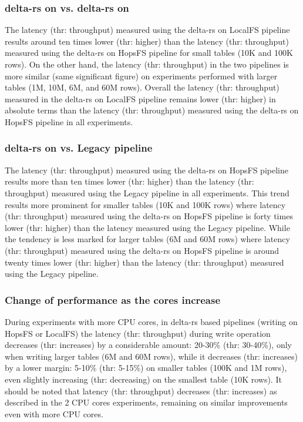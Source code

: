 \subsubsection*{delta-rs on  vs. delta-rs on }

The latency (thr: throughput) measured using the delta-rs on \gls{LocalFS} pipeline results around ten times lower (thr: higher) than the latency (thr: throughput) measured using the delta-rs on \gls{HopsFS} pipeline for small tables (10K and 100K rows). On the other hand, the latency (thr: throughput) in the two pipelines is more similar (same significant figure) on experiments performed with larger tables (1M, 10M, 6M, and 60M rows). Overall the latency (thr: throughput) measured in the delta-rs on \gls{LocalFS} pipeline remains lower (thr: higher) in absolute terms than the latency (thr: throughput) measured using the delta-rs on \gls{HopsFS} pipeline in all experiments.

\subsubsection*{delta-rs on  vs. Legacy pipeline}

The latency (thr: throughput) measured using the delta-rs on \gls{HopsFS} pipeline results more than ten times lower (thr: higher) than the latency (thr: throughput) measured using the Legacy pipeline in all experiments. This trend results more prominent for smaller tables (10K and 100K rows) where latency (thr: throughput) measured using the delta-rs on \gls{HopsFS} pipeline is forty times lower (thr: higher) than the latency measured using the Legacy pipeline. While the tendency is less marked for larger tables (6M and 60M rows) where latency (thr: throughput) measured using the delta-rs on \gls{HopsFS} pipeline is around twenty times lower (thr: higher) than the latency (thr: throughput) measured using the Legacy pipeline.

\subsubsection*{Change of performance as the  cores increase}

During experiments with more \gls{CPU} cores, in delta-rs based pipelines (writing on \gls{HopsFS} or \gls{LocalFS}) the latency (thr: throughput) during write operation decreases (thr: increases) by a considerable amount: 20-30\% (thr: 30-40\%), only when writing larger tables (6M and 60M rows), while it decreases (thr: increases) by a lower margin: 5-10\% (thr: 5-15\%) on smaller tables (100K and 1M rows), even slightly increasing (thr: decreasing) on the smallest table (10K rows). It should be noted that latency (thr: throughput) decreases (thr: increases) as described in the 2 \gls{CPU} cores experiments, remaining on similar improvements even with more \gls{CPU} cores.

